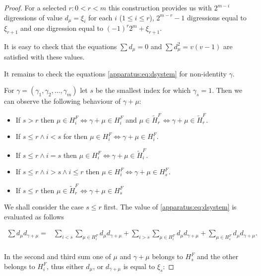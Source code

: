 \begin{proof}
	For a selected $r \colon 0 < r < m$ this construction provides us with $2^{m-i}$ digressions of value $d_\mu=\xi_i$ for each $i$ ($1 \leq i\leq r$), $2^{m-r}-1$ digressions equal to $\xi_{r+1}$ and one digression equal to $(-1)^r 2^m+\xi_{r+1}$.
    
    It is easy to check that the equations $\sum d_\mu = 0$ and $\sum d_\mu^2 = v(v-1)$ are satisfied with these values.
    
    It remains to check the equations \eqref{apparatus:eq:dsystem} for non-identity $\gamma$.
    
    For $\gamma = (\gamma_1, \gamma_2, \ldots, \gamma_m)$ let $s$ be the smallest index for which $\gamma_s=1$. Then we can observe the following behaviour of $\gamma + \mu$:
    \begin{itemize}
        \item If $s > r$ then $\mu \in H_i^F \iff  \gamma + \mu \in H_i^F$ and $\mu \in \widetilde H_r^F \iff  \gamma + \mu \in \widetilde H_r^F$.
        \item If $s \leq r \land i < s$ for then $\mu \in H_i^F \iff  \gamma + \mu \in H_i^F$.
        \item If $s \leq r \land i = s$ then $\mu \in H_i^F \iff  \gamma + \mu \in \widetilde H_i^F$.
        \item If $s \leq r \land i > s \land i \leq r$ then $\mu \in H_i^F \iff  \gamma + \mu \in H_s^F$.
        \item If $s \leq r$ then $\mu \in \widetilde H_r^F \iff \gamma + \mu \in H_s^F$
    \end{itemize}
    
    We shall consider the case $s\leq r$ first. The value of \eqref{apparatus:eq:dsystem} is evaluated as follows
    
    \begin{equation}
        \begin{split}
            \sum d_\mu d_{\gamma+\mu}
              = & \sum\limits_{i<s} \sum\limits_{\mu \in H_i^F} d_\mu d_{\gamma + \mu}
                + \sum\limits_{i>s} \sum\limits_{\mu \in H_i^F} d_\mu d_{\gamma + \mu}
                + \sum\limits_{\mu \in H_s^F} d_\mu d_{\gamma + \mu}. \\
        \end{split}
    \end{equation}
    
    In the second and third sum one of $\mu$ and $\gamma + \mu$ belongs to $H_s^F$ and the other belongs to $H_i^F$,
thus either $d_\mu$, or $d_{\gamma+\mu}$ is equal to $\xi_s$:
    

\end{proof}
